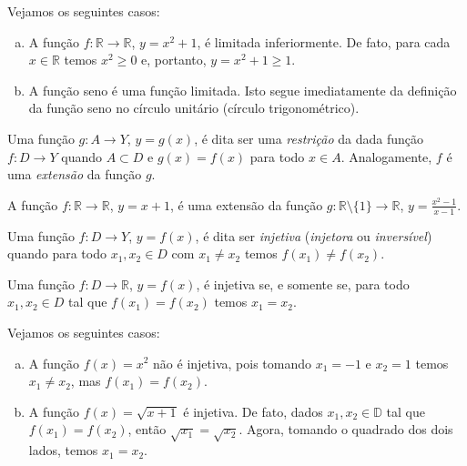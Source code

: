\begin{ex}
  Vejamos os seguintes casos:
  \begin{enumerate}[a)]
  \item A função $f:\mathbb{R}\to\mathbb{R}$, $y=x^2+1$, é limitada inferiormente. De fato, para cada $x\in \mathbb{R}$ temos $x^2\geq 0$ e, portanto, $y = x^2+1 \geq 1$.
  \item A função seno é uma função limitada. Isto segue imediatamente da definição da função seno no círculo unitário (círculo trigonométrico).
  \end{enumerate}
\end{ex}

\begin{defn}
  Uma função $g:A\to Y$, $y=g(x)$, é dita ser uma \emph{restrição} da dada função $f:D\to Y$ quando $A\subset D$ e $g(x)=f(x)$ para todo $x\in A$. Analogamente, $f$ é uma \emph{extensão} da função $g$.
\end{defn}

\begin{ex}
  A função $f:\mathbb{R}\to\mathbb{R}$, $y=x+1$, é uma extensão da função $g:\mathbb{R}\setminus\{1\}\to\mathbb{R}$, $\displaystyle y=\frac{x^2-1}{x-1}$.
\end{ex}

\begin{defn}
  Uma função $f:D\to Y$, $y=f(x)$, é dita ser \emph{injetiva} (\emph{injetora} ou \emph{inversível}) quando para todo $x_1, x_2\in D$ com $x_1\neq x_2$ temos $f(x_1)\neq f(x_2)$.
\end{defn}

\begin{obs}
  Uma função $f:D\to\mathbb{R}$, $y=f(x)$, é injetiva se, e somente se, para todo $x_1, x_2\in D$ tal que $f(x_1)=f(x_2)$ temos $x_1=x_2$.
\end{obs}

\begin{ex}
  Vejamos os seguintes casos:
  \begin{enumerate}[a)]
  \item A função $f(x) = x^2$ não é injetiva, pois tomando $x_1=-1$ e $x_2=1$ temos $x_1\neq x_2$, mas $f(x_1)=f(x_2)$.
  \item A função $f(x) = \sqrt{x+1}$ é injetiva. De fato, dados $x_1, x_2\in\mathbb{D}$ tal que $f(x_1)=f(x_2)$, então $\sqrt{x_1} = \sqrt{x_2}$. Agora, tomando o quadrado dos dois lados, temos $x_1 = x_2$.
  \end{enumerate}
\end{ex}

